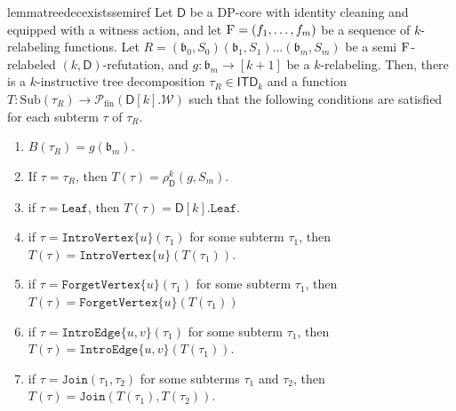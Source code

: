 \documentclass[11pt,a4paper]{article}
\newcommand{\treewidthvalue}{k}
\newcommand{\abag}{\mathfrak{b}}
\newcommand{\allsubterms}{\mathrm{Sub}}
\newcommand{\introvertextype}[1]{\mathtt{IntroVertex}\{#1\}}
\newcommand{\forgetvertextype}[1]{\mathtt{ForgetVertex}\{#1\}}
\newcommand{\jointype}{\mathtt{Join}}
\newcommand{\leaftype}{\mathtt{Leaf}}
\newcommand{\introedgegeneric}[2]{\mathtt{IntroEdge}\{#1,#2\}}
\newcommand{\initialsetgeneric}{\mathtt{Leaf}}
\newcommand{\topbagname}{B}
\newcommand{\topbag}[1]{\topbagname(#1)}
\newcommand{\allabstractdecompositionstreewidth}[1]{\mathsf{ITD}_{#1}}
\newcommand{\abstractdecomposition}{\tau}
\newcommand{\vertexone}{u}
\newcommand{\vertextwo}{v}
\newcommand{\allwitnesses}{\mathcal{W}}
\newcommand{\finitepowerset}[1]{\mathcal{P}_{\mathrm{fin}}(#1)}
\newcommand{\dpcore}{\mathsf{D}}
\newcommand{\witnessset}{S}
\newcommand{\dprefutation}{R}
\newcommand{\subtermToBag}{T}
\newcommand{\relabelingfunction}{f}
\newcommand{\action}{\rho}
\newcommand{\relabelsequence}{\textsc{F}}
\begin{document}
		\begin{restatable}{lemma}{treedecexistssemiref}
		\label{lemma:tree decomposition-existence-sequence-relabel-semi-refutation}
		Let $\dpcore$ be a DP-core with identity cleaning and equipped with a witness action, and let $\relabelsequence=(\relabelingfunction_1,\dots,\relabelingfunction_m)$ be a sequence of $k$-relabeling functions. Let  $\dprefutation =(\abag_0,\witnessset_0)(\abag_1,\witnessset_1)\dots(\abag_m,\witnessset_m)$ be a semi $\relabelsequence$-relabeled $(\treewidthvalue,\dpcore)$-refutation, and $g:\abag_m\to [\treewidthvalue+1]$ be a $\treewidthvalue$-relabeling.
	Then, there is a $\treewidthvalue$-instructive tree decomposition $\abstractdecomposition_{\dprefutation}\in \allabstractdecompositionstreewidth{\treewidthvalue}$ and a function
	$\subtermToBag: \allsubterms(\abstractdecomposition_{\dprefutation}) \to \finitepowerset{\dpcore[\treewidthvalue].\allwitnesses}$
	such that the following conditions are satisfied for each subterm $\abstractdecomposition$ of $\abstractdecomposition_{\dprefutation}$.
\begin{enumerate}
    \item\label{existenceZero} $\topbag{\abstractdecomposition_{\dprefutation}} = g(\abag_m)$.
    \item\label{existenceOne} If $\abstractdecomposition=\abstractdecomposition_{\dprefutation}$, then $\subtermToBag(\abstractdecomposition) = \action_{\dpcore}^{\treewidthvalue}(g,\witnessset_m)$.
    \item\label{existenceTwo} if $\abstractdecomposition = \leaftype$, then
    $\subtermToBag(\abstractdecomposition) = \dpcore[\treewidthvalue].\initialsetgeneric$.
    \item\label{existenceThree} if $\abstractdecomposition = \introvertextype{\vertexone}(\abstractdecomposition_1)$ for some subterm $\abstractdecomposition_1$, then
    $\subtermToBag(\abstractdecomposition) = \introvertextype{\vertexone}(\subtermToBag(\abstractdecomposition_1))$.
    \item\label{existenceFour} if $\abstractdecomposition = \forgetvertextype{\vertexone}(\abstractdecomposition_1)$ for some subterm $\abstractdecomposition_1$, then
    $\subtermToBag(\abstractdecomposition) = \forgetvertextype{\vertexone}(\subtermToBag(\abstractdecomposition_1))$
    \item\label{existenceFive} if $\abstractdecomposition = \introedgegeneric{\vertexone}{\vertextwo}(\abstractdecomposition_1)$ for some subterm $\abstractdecomposition_1$, then
    $\subtermToBag(\abstractdecomposition) = \introedgegeneric{\vertexone}{\vertextwo}(\subtermToBag(\abstractdecomposition_1))$.
    \item\label{existenceSix} if $\abstractdecomposition = \jointype(\abstractdecomposition_1,\abstractdecomposition_2)$ for some subterms $\abstractdecomposition_1$ and $\abstractdecomposition_2$, then $\subtermToBag(\abstractdecomposition) = \jointype(\subtermToBag(\abstractdecomposition_1),\subtermToBag(\abstractdecomposition_2))$.
\end{enumerate}
\end{restatable}
\end{document}
